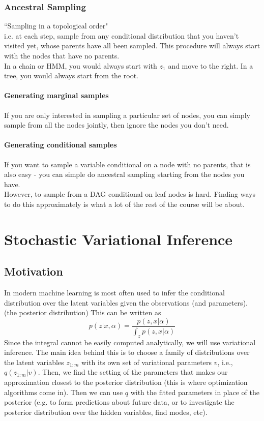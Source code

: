 \documentclass[11pt]{article}
\begin{document}
\subsubsection{Ancestral Sampling}
``Sampling in a topological order"\\
i.e. at each step, sample from any conditional distribution that you haven't visited yet, whose parents have all been sampled. This procedure will always start with the nodes that have no parents.\\
\example
In a chain or HMM, you would always start with $z_1$ and move to the right. In a tree, you would always start from the root.

\paragraph{Generating marginal samples}
If you are only interested in sampling a particular set of nodes, you can simply sample from all the nodes jointly, then ignore the nodes you don't need.

\paragraph{Generating conditional samples}
If you want to sample a variable conditional on a node with no parents, that is also easy - you can simple do ancestral sampling starting from the nodes you have.\\
However, to sample from a DAG conditional on leaf nodes is hard. Finding ways to do this approximately is what a lot of the rest of the course will be about.
\section{Stochastic Variational Inference}
\subsection{Motivation}
In modern machine learning is most often used to infer the conditional distribution over the latent variables given the observations (and parameters). (the posterior distribution) This can be written as
$$p(z|x,\alpha) = \frac{p(z, x|\alpha)}{\int_z p(z,x|\alpha)}$$
Since the integral cannot be easily computed analytically, we will use variational inference. The main idea behind this is to choose a family of distributions over the latent variables $z_{1:m}$ with its own set of variational parameters $v$, i.e., $q(z_{1:m}|v)$. Then, we find the setting of the parameters that makes our approximation closest to the posterior distribution (this is where optimization algorithms come in). Then we can use $q$ with the fitted parameters in place of the posterior (e.g. to form predictions about future data, or to investigate the posterior distribution over the hidden variables, find modes, etc).
\end{document}
